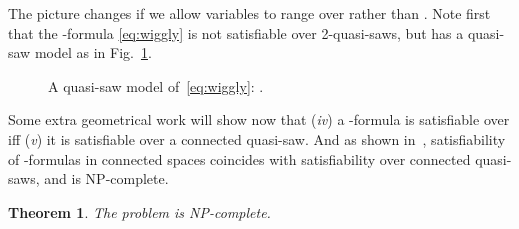 \documentclass{article}
\newtheorem{theorem}{Theorem}
\newcommand{\NP}{\textsc{NP}}
\begin{document}
The picture changes if we allow variables to range over 
rather than . Note first that the -formula
\eqref{eq:wiggly} is not satisfiable over 2-quasi-saws, but has a
quasi-saw model as in Fig.~\ref{fig:broom}.
\begin{figure}[ht]
\centering{}
\vspace*{-3mm}
\caption{A quasi-saw model  of~\eqref{eq:wiggly}: .}
\label{fig:broom}
\end{figure}
Some extra geometrical work will show now that ({\em iv}) a
-formula is satisfiable over  iff ({\em v}) it is
satisfiable over a connected quasi-saw.  And as shown
in~\cite{ijcai:kp-hwz10}, satisfiability of -formulas in
connected spaces coincides with satisfiability over connected
quasi-saws, and is \NP-complete.
\begin{theorem}\label{theo:BciRCR3}
The problem  is \NP-complete.
\end{theorem}
\end{document}
